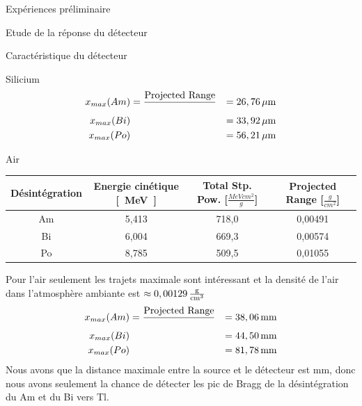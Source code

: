 \documentclass[a4paper,11pt]{scrartcl}
\begin{document}
\begin{section}{Expériences préliminaire}
\begin{subsection}{Etude de la réponse du détecteur}
\begin{subsubsection}{Caractéristique du détecteur}
\begin{paragraph}{Silicium}
    \begin{eqnarray*}
     x_{max}(Am)&=\frac{\text{Projected Range}}{\rho}&=\unit[26,76]{\mu m}\\
     x_{max}(Bi)&&=\unit[33,92]{\mu m}\\
     x_{max}(Po)&&=\unit[56,21]{\mu m}
    \end{eqnarray*}
   \end{paragraph}
   \begin{paragraph}{Air}
    \begin{center}
     \begin{tabular}{c|c|c|c}
      Désintégration & Energie cinétique \unit{[MeV]} & Total Stp. Pow. [$\frac{MeV cm^2}{g}$] & Projected Range [$\frac{g}{cm^2}$] \\ \hline
      Am & 5,413 & 718,0 & 0,00491 \\ 
      Bi & 6,004 & 669,3 & 0,00574 \\ 
      Po & 8,785 & 509,5 & 0,01055 \\ 
     \end{tabular}
    \end{center}
    Pour l'air seulement les trajets maximale sont intéressant et la densité de l'air dans l'atmosphère ambiante est $\rho\approx\unit[0,00129]{\frac{g}{cm^3}}$
    \begin{eqnarray*}
     x_{max}(Am)&=\frac{\text{Projected Range}}{\rho}&=\unit[38,06]{mm}\\
     x_{max}(Bi)&&=\unit[44,50]{mm}\\
     x_{max}(Po)&&=\unit[81,78]{mm}
    \end{eqnarray*}
    Nous avons que la distance maximale entre la source et le détecteur est \unit[45]{mm}, donc nous avons seulement la chance de détecter les pic de Bragg de la désintégration du Am et du Bi vers Tl.
   \end{paragraph}

     
   \end{subsubsection}


\end{subsection}
\end{section}
\end{document}
